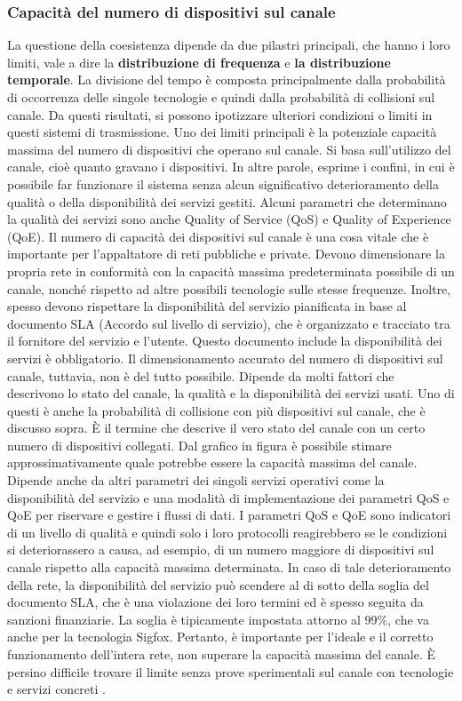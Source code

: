 \documentclass[a4paper]{report} %
\begin{document}
\subsubsection{Capacità del numero di dispositivi sul canale}
La questione della coesistenza dipende da due pilastri principali, che hanno i loro limiti, vale a dire la \textbf{distribuzione di frequenza} e \textbf{la distribuzione temporale}. La divisione del tempo è composta principalmente dalla probabilità di occorrenza delle singole tecnologie e quindi dalla probabilità di collisioni sul canale. Da questi risultati, si possono ipotizzare ulteriori condizioni o limiti in questi sistemi di trasmissione. Uno dei limiti principali è la potenziale capacità massima del numero di dispositivi che operano sul canale. Si basa sull'utilizzo del canale, cioè quanto gravano i dispositivi. In altre parole, esprime i confini, in cui è possibile far funzionare il sistema senza alcun significativo deterioramento della qualità o della disponibilità dei servizi gestiti. Alcuni parametri che determinano la qualità dei servizi sono anche Quality of Service (QoS) e Quality of Experience (QoE). Il numero di capacità dei dispositivi sul canale è una cosa vitale che è importante per l'appaltatore di reti pubbliche e private. Devono dimensionare la propria rete in conformità con la capacità massima predeterminata possibile di un canale, nonché rispetto ad altre possibili tecnologie sulle stesse frequenze. Inoltre, spesso devono rispettare la disponibilità del servizio pianificata in base al documento SLA (Accordo sul livello di servizio), che è organizzato e tracciato tra il fornitore del servizio e l'utente. Questo documento include la disponibilità dei servizi è obbligatorio. Il dimensionamento accurato del numero di dispositivi sul canale, tuttavia, non è del tutto possibile. Dipende da molti fattori che descrivono lo stato del canale, la qualità e la disponibilità dei servizi usati. Uno di questi è anche la probabilità di collisione con più dispositivi sul canale, che è discusso sopra. È il termine che descrive il vero stato del canale con un certo numero di dispositivi collegati. Dal grafico in figura è possibile stimare approssimativamente quale potrebbe essere la capacità massima del canale. Dipende anche da altri parametri dei singoli servizi operativi come la disponibilità del servizio e una modalità di implementazione dei parametri QoS e QoE per riservare e gestire i flussi di dati. I parametri QoS e QoE sono indicatori di un livello di qualità e quindi solo i loro protocolli reagirebbero se le condizioni si deteriorassero a causa, ad esempio, di un numero maggiore di dispositivi sul canale rispetto alla capacità massima determinata. In caso di tale deterioramento della rete, la disponibilità del servizio può scendere al di sotto della soglia del documento SLA, che è una violazione dei loro termini ed è spesso seguita da sanzioni finanziarie. La soglia è tipicamente impostata attorno al 99\%, che va anche per la tecnologia Sigfox. Pertanto, è importante per l'ideale e il corretto funzionamento dell'intera rete, non superare la capacità massima del canale. È persino difficile trovare il limite senza prove sperimentali sul canale con tecnologie e servizi concreti \cite{art:rif.46}.
\end{document}
